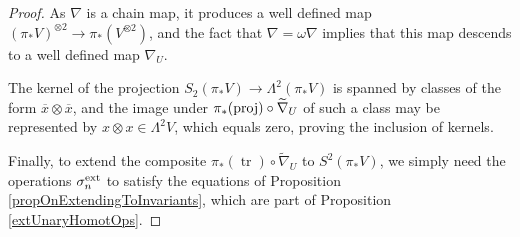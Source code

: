 \documentclass[11pt]{amsart} \renewcommand{\baselinestretch}{1.2}
\theoremstyle{plain}
\theoremstyle{definition}
\DeclareMathOperator{\trace}{tr}
\newcommand{\DASH}{\mathrm{-}}
\renewcommand{\to}{\longrightarrow}
\newcommand{\calV}{\mathcal{V}}
\newcommand{\restn}[1]{#1^{[2]}}
\newcommand{\vect}[2]{\calV^{#1}_{#2}}
\newcommand{\twist}{\omega}
\newcommand{\Nabla}{\nabla}
\renewcommand{\mapsto}{\longmapsto}
\begin{document}
\begin{Constructing homotopy operations}
\begin{proof}
As $\nabla$ is a chain  map, it produces a well defined map $(\pi_*V)^{\otimes2}\to \pi_*(V^{\otimes2})$, and the fact that $\nabla=\twist\nabla$ implies that this map descends to a well defined map $\nabla_U$.

The kernel of the projection $S_2(\pi_*V)\to \Lambda^2(\pi_*V)$ is spanned by classes of the form $\overline{x}\otimes \overline{x}$, and the image under $\pi_*(\textup{proj})\circ\widetilde{\nabla}_U$ of such a class may be represented by $x\otimes x\in \Lambda^2V$, which equals zero, proving the inclusion of kernels.

Finally, to extend the composite $\pi_*(\trace)\circ\widetilde{\nabla}_U$ to $S^2(\pi_*V)$, we simply need the operations $\sigma_n^\textup{ext}$ to satisfy the equations of Proposition \ref{propOnExtendingToInvariants}, which are part of Proposition \ref{extUnaryHomotOps}.
%
%
%
%
%
\end{proof}


\end{Constructing homotopy operations}
\end{document}
